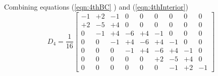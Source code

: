 \documentclass[a4paper]{report}
\begin{document}
Combining equations (\ref{eqn:4thBC} ) and (\ref{eqn:4thInterior})
\begin{equation}
    D_4  =
    \frac{1}{16}
    \begin{bmatrix}
        -1  & +2 & -1  &  0  &  0  &  0  &  0  &  0  &  0    \\ 
        +2  & -5 & +4  &  0  &  0  &  0  &  0  &  0  &  0    \\ 
         0  & -1 & +4  & -6  & +4  & -1  &  0  &  0  &  0    \\ 
         0  &  0 & -1  & +4  & -6  & +4  &  -1  &  0  &  0    \\ 
         0  &  0 &  0  & -1  & +4  & -6  & +4  & -1  &  0     \\ 
         0  &  0 &  0  &  0  & 0   & +2  & -5  & +4  &  0      \\ 
         0  &  0  &  0 &  0  & 0   &  0  & -1  & +2  & -1       
    \end{bmatrix}
\end{equation}
\cite{kennedy1997comparison}
\newpage


\end{document}

